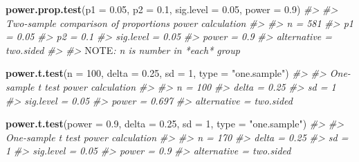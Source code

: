\documentclass[]{book}
\newenvironment{Shaded}{\begin{snugshade}}{\end{snugshade}}
\newcommand{\AlertTok}[1]{\textcolor[rgb]{0.94,0.16,0.16}{#1}}
\newcommand{\CommentTok}[1]{\textcolor[rgb]{0.56,0.35,0.01}{\textit{#1}}}
\newcommand{\DataTypeTok}[1]{\textcolor[rgb]{0.13,0.29,0.53}{#1}}
\newcommand{\DecValTok}[1]{\textcolor[rgb]{0.00,0.00,0.81}{#1}}
\newcommand{\FloatTok}[1]{\textcolor[rgb]{0.00,0.00,0.81}{#1}}
\newcommand{\KeywordTok}[1]{\textcolor[rgb]{0.13,0.29,0.53}{\textbf{#1}}}
\newcommand{\NormalTok}[1]{#1}
\newcommand{\StringTok}[1]{\textcolor[rgb]{0.31,0.60,0.02}{#1}}
\theoremstyle{definition}
\theoremstyle{definition}
\theoremstyle{definition}
\theoremstyle{remark}
\begin{document}
\begin{Shaded}
\begin{Highlighting}[]
\KeywordTok{power.prop.test}\NormalTok{(}\DataTypeTok{p1 =} \FloatTok{0.05}\NormalTok{, }\DataTypeTok{p2 =} \FloatTok{0.1}\NormalTok{, }\DataTypeTok{sig.level =} \FloatTok{0.05}\NormalTok{, }\DataTypeTok{power =} \FloatTok{0.9}\NormalTok{)}
\CommentTok{#> }
\CommentTok{#>      Two-sample comparison of proportions power calculation }
\CommentTok{#> }
\CommentTok{#>               n = 581}
\CommentTok{#>              p1 = 0.05}
\CommentTok{#>              p2 = 0.1}
\CommentTok{#>       sig.level = 0.05}
\CommentTok{#>           power = 0.9}
\CommentTok{#>     alternative = two.sided}
\CommentTok{#> }
\CommentTok{#> }\AlertTok{NOTE}\CommentTok{: n is number in *each* group}
\end{Highlighting}
\end{Shaded}

\begin{Shaded}
\begin{Highlighting}[]
\KeywordTok{power.t.test}\NormalTok{(}\DataTypeTok{n =} \DecValTok{100}\NormalTok{, }\DataTypeTok{delta =} \FloatTok{0.25}\NormalTok{, }\DataTypeTok{sd =} \DecValTok{1}\NormalTok{, }\DataTypeTok{type =} \StringTok{"one.sample"}\NormalTok{)}
\CommentTok{#> }
\CommentTok{#>      One-sample t test power calculation }
\CommentTok{#> }
\CommentTok{#>               n = 100}
\CommentTok{#>           delta = 0.25}
\CommentTok{#>              sd = 1}
\CommentTok{#>       sig.level = 0.05}
\CommentTok{#>           power = 0.697}
\CommentTok{#>     alternative = two.sided}
\end{Highlighting}
\end{Shaded}

\begin{Shaded}
\begin{Highlighting}[]
\KeywordTok{power.t.test}\NormalTok{(}\DataTypeTok{power =} \FloatTok{0.9}\NormalTok{, }\DataTypeTok{delta =} \FloatTok{0.25}\NormalTok{, }\DataTypeTok{sd =} \DecValTok{1}\NormalTok{, }\DataTypeTok{type =} \StringTok{"one.sample"}\NormalTok{)}
\CommentTok{#> }
\CommentTok{#>      One-sample t test power calculation }
\CommentTok{#> }
\CommentTok{#>               n = 170}
\CommentTok{#>           delta = 0.25}
\CommentTok{#>              sd = 1}
\CommentTok{#>       sig.level = 0.05}
\CommentTok{#>           power = 0.9}
\CommentTok{#>     alternative = two.sided}
\end{Highlighting}
\end{Shaded}
\end{document}
